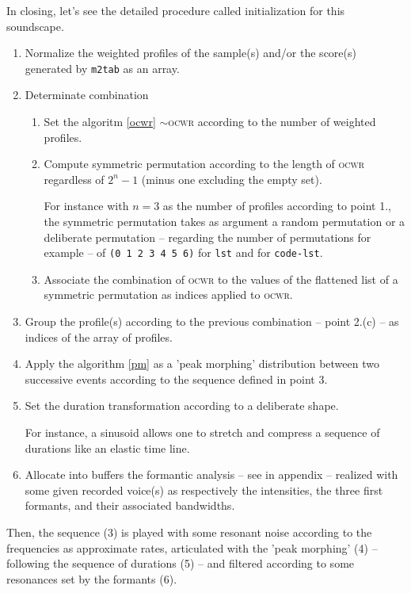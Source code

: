\bigskip
In closing, let's see the detailed procedure called initialization for this soundscape. 

\begin{enumerate}
\label{m2tprecedure}
 \item Normalize the weighted profiles of the sample(s) and/or the score(s) generated by \texttt{m2tab} 
 as an array.
  \item Determinate combination
  \begin{enumerate}
  \item Set the algoritm \ref{ocwr} $\sim$\textsc{ocwr} according to the number of weighted profiles.
 
  \item Compute symmetric permutation according to the length of \textsc{ocwr} regardless of $2^n-1$ (minus one excluding the empty set).
  
  For instance with $n=3$ as the number of profiles according to point 1., the symmetric permutation takes as argument a random permutation or a deliberate permutation -- regarding the number of permutations for example -- of \texttt{(0 1 2 3 4 5 6)} for \texttt{lst} and for \texttt{code-lst}.
  \item Associate the combination of \textsc{ocwr} to the values of the flattened list of a symmetric permutation as indices applied to \textsc{ocwr}.
\end{enumerate}
\item Group the profile(s) according to the previous combination -- point 2.(c) -- as indices of the array of profiles.
\item Apply the algorithm \ref{pm} as a 'peak morphing' distribution between two successive events according to the sequence defined in point 3.
\item Set the duration transformation according to a deliberate shape.

For instance, a sinusoid allows one to stretch and compress a sequence of durations like an elastic time line.
\item Allocate into buffers the formantic analysis -- see  in appendix  -- realized with some given recorded voice(s) as respectively the intensities, the three first formants, and their associated bandwidths.
\end{enumerate}
Then, the sequence (3) is played with some resonant noise according to the frequencies as approximate rates, articulated with the 'peak morphing' (4) -- following the sequence of durations (5) -- and filtered according to some resonances set by the formants (6).

